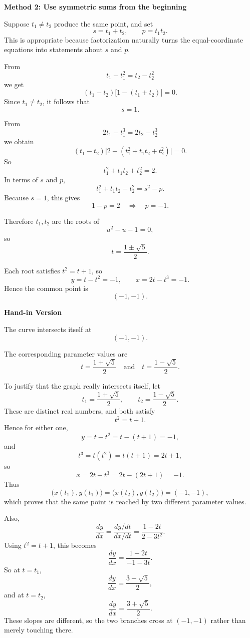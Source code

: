 \documentclass[a4paper,12pt,twocolumn]{article}
\newenvironment{solutionbox}{\begin{framed}}{\end{framed}}
\begin{document}
\begin{solutionbox}
\textbf{Method 2: Use symmetric sums from the beginning}

\begin{steps}
\item Suppose \(t_1\neq t_2\) produce the same point, and set
\[
s=t_1+t_2,\qquad p=t_1t_2.
\]
This is appropriate because factorization naturally turns the equal-coordinate equations into statements about \(s\) and \(p\).

\item From
\[
t_1-t_1^2=t_2-t_2^2
\]
we get
\[
(t_1-t_2)\bigl[1-(t_1+t_2)\bigr]=0.
\]
Since \(t_1\neq t_2\), it follows that
\[
s=1.
\]

\item From
\[
2t_1-t_1^3=2t_2-t_2^3
\]
we obtain
\[
(t_1-t_2)\bigl[2-(t_1^2+t_1t_2+t_2^2)\bigr]=0.
\]
So
\[
t_1^2+t_1t_2+t_2^2=2.
\]
In terms of \(s\) and \(p\),
\[
t_1^2+t_1t_2+t_2^2=s^2-p.
\]
Because \(s=1\), this gives
\[
1-p=2
\quad\Longrightarrow\quad
p=-1.
\]

\item Therefore \(t_1,t_2\) are the roots of
\[
u^2-u-1=0,
\]
so
\[
t=\frac{1\pm\sqrt5}{2}.
\]

\item Each root satisfies \(t^2=t+1\), so
\[
y=t-t^2=-1,
\qquad
x=2t-t^3=-1.
\]
Hence the common point is
\[
(-1,-1).
\]
\end{steps}
\end{solutionbox}

\begin{solutionbox}
\textbf{Hand-in Version}

The curve intersects itself at
\[
\boxed{(-1,-1)}.
\]

The corresponding parameter values are
\[
\boxed{t=\frac{1+\sqrt5}{2}\quad\text{and}\quad t=\frac{1-\sqrt5}{2}.}
\]

To justify that the graph really intersects itself, let
\[
t_1=\frac{1+\sqrt5}{2},\qquad t_2=\frac{1-\sqrt5}{2}.
\]
These are distinct real numbers, and both satisfy
\[
t^2=t+1.
\]
Hence for either one,
\[
y=t-t^2=t-(t+1)=-1,
\]
and
\[
t^3=t(t^2)=t(t+1)=2t+1,
\]
so
\[
x=2t-t^3=2t-(2t+1)=-1.
\]
Thus
\[
\bigl(x(t_1),y(t_1)\bigr)=\bigl(x(t_2),y(t_2)\bigr)=(-1,-1),
\]
which proves that the same point is reached by two different parameter values.

Also,
\[
\frac{dy}{dx}=\frac{dy/dt}{dx/dt}
=\frac{1-2t}{2-3t^2}.
\]
Using \(t^2=t+1\), this becomes
\[
\frac{dy}{dx}=\frac{1-2t}{-1-3t}.
\]
So at \(t=t_1\),
\[
\frac{dy}{dx}=\frac{3-\sqrt5}{2},
\]
and at \(t=t_2\),
\[
\frac{dy}{dx}=\frac{3+\sqrt5}{2}.
\]
These slopes are different, so the two branches cross at \((-1,-1)\) rather
than merely touching there.
\end{solutionbox}
\end{document}
